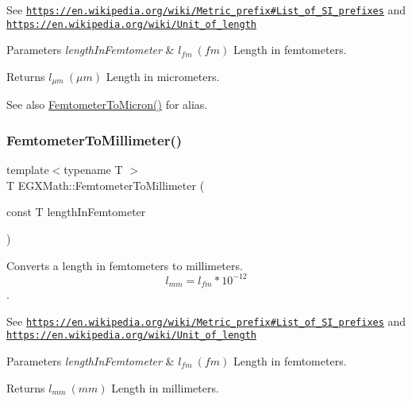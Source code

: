 See \href{https://en.wikipedia.org/wiki/Metric_prefix#List_of_SI_prefixes}{\tt https\+://en.\+wikipedia.\+org/wiki/\+Metric\+\_\+prefix\#\+List\+\_\+of\+\_\+\+S\+I\+\_\+prefixes} and \href{https://en.wikipedia.org/wiki/Unit_of_length}{\tt https\+://en.\+wikipedia.\+org/wiki/\+Unit\+\_\+of\+\_\+length} 
\begin{DoxyParams}{Parameters}
{\em length\+In\+Femtometer} & $ l_{fm}\ (fm)$ Length in femtometers. \\
\hline
\end{DoxyParams}
\begin{DoxyReturn}{Returns}
$ l_{\mu m}\ (\mu m)$ Length in micrometers. 
\end{DoxyReturn}
\begin{DoxySeeAlso}{See also}
\mbox{\hyperlink{group___e_g_x_math-_conversions-_length_conversions-_femtometer-_non-_s_i_gac1a358bdb9bf33dec3cb847cafe1bc71}{Femtometer\+To\+Micron()}} for alias. 
\end{DoxySeeAlso}
\mbox{\label{group___e_g_x_math-_conversions-_length_conversions-_femtometer-_s_i_ga2e6d6c0aad4502554b05f677ff248bc8}} 
\subsubsection{\texorpdfstring{Femtometer\+To\+Millimeter()}{FemtometerToMillimeter()}}
{\footnotesize\ttfamily template$<$typename T $>$ \\
T E\+G\+X\+Math\+::\+Femtometer\+To\+Millimeter (\begin{DoxyParamCaption}\item[{const T}]{length\+In\+Femtometer }\end{DoxyParamCaption})}



Converts a length in femtometers to millimeters. \[ l_{mm}=l_{fm} * 10^{-12} \]. 

See \href{https://en.wikipedia.org/wiki/Metric_prefix#List_of_SI_prefixes}{\tt https\+://en.\+wikipedia.\+org/wiki/\+Metric\+\_\+prefix\#\+List\+\_\+of\+\_\+\+S\+I\+\_\+prefixes} and \href{https://en.wikipedia.org/wiki/Unit_of_length}{\tt https\+://en.\+wikipedia.\+org/wiki/\+Unit\+\_\+of\+\_\+length} 
\begin{DoxyParams}{Parameters}
{\em length\+In\+Femtometer} & $ l_{fm}\ (fm)$ Length in femtometers. \\
\hline
\end{DoxyParams}
\begin{DoxyReturn}{Returns}
$ l_{mm}\ (mm)$ Length in millimeters. 
\end{DoxyReturn}
\mbox{\label{group___e_g_x_math-_conversions-_length_conversions-_femtometer-_s_i_ga61aa82ad734717567c959f0d4e840076}} 
